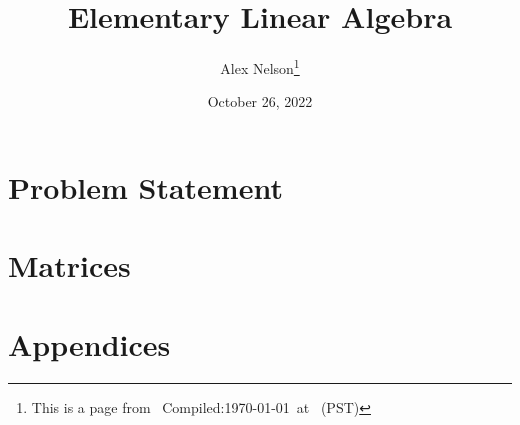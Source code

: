 \documentclass{article}
\title{Elementary Linear Algebra}
\author{Alex Nelson\thanks{This is a page from \homeurl{}\hfil\break\indent\;\, Compiled:\enspace\today\ at \currenttime\ (PST)}}
\date{October 26, 2022}
\begin{document}
\maketitle
\tableofcontents

\part{Problem Statement}

\part{Matrices}




\vfill\eject
\part{Appendices}
\appendix


\end{document}
